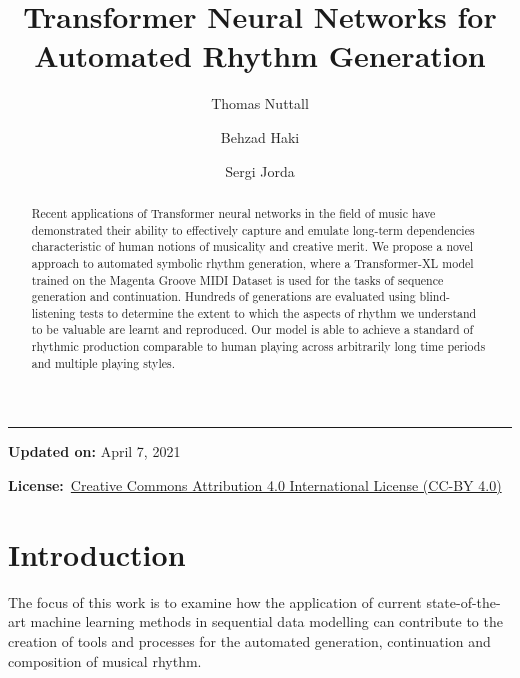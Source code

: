 \documentclass[sigconf]{nimeart}
\begin{document}
\title[Transformer Neural Networks for Automated Rhythm Generation]{Transformer Neural Networks for Automated Rhythm Generation}
\author{Thomas Nuttall}
\affiliation{\institution{}\country{}}
\author{Behzad Haki}
\affiliation{\institution{}\country{}}
\author{Sergi Jorda}
\affiliation{\institution{}\country{}}
\renewcommand{\shortauthors}{Nuttall et al.}
\begin{abstract}
Recent applications of Transformer neural networks in the field of music have demonstrated their ability to effectively capture and emulate long-term dependencies characteristic of human notions of musicality and creative merit. We propose a novel approach to automated symbolic rhythm generation, where a Transformer-XL model trained on the Magenta Groove MIDI Dataset is used for the tasks of sequence generation and continuation. Hundreds of generations are evaluated using blind-listening tests to determine the extent to which the aspects of rhythm we understand to be valuable are learnt and reproduced. Our model is able to achieve a standard of rhythmic production comparable to human playing across arbitrarily long time periods and multiple playing styles.
\end{abstract}

\maketitle
\begin{center}\rule{0.5\linewidth}{0.5pt}\end{center}

\textbf{Updated on:} April 7, 2021

\textbf{License:}~\href{https://creativecommons.org/licenses/by/4.0/}{Creative Commons Attribution 4.0 International License (CC-BY 4.0)}

\section{Introduction}\label{introduction}

The focus of this work is to examine how the application of current state-of-the-art machine learning methods in sequential data modelling can contribute to the creation of tools and processes for the automated generation, continuation and composition of musical rhythm.
\end{document}
